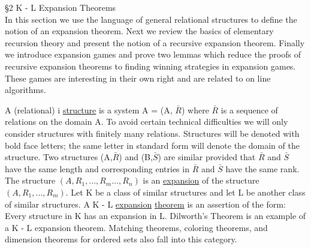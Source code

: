 \documentclass[twoside]{article}
\begin{document}
§2   K - L   Expansion Theorems\\


In this section we use the language of general relational structures to define the notion of an expansion theorem.   Next we review the basics of elementary recursion theory and present the notion of a recursive expansion theorem.    Finally we introduce expansion games and prove two lemmas which reduce the proofs of recursive expansion theorems to finding winning strategies in expansion games.   These games are interesting in their own right and are related to on line algorithms.

\newpage

A (relational) i \underline{structure} is a system   A = (A, $\bar{R}$)   where   $\bar{R}$   is a sequence of relations on the domain   A.   
To avoid certain technical difficulties we will only consider structures with finitely many relations.    
Structures will be denoted with bold face letters;  the same letter in standard form will denote the domain of the structure.   
Two structures (A,$\bar{R}$)   and   (B,$\bar{S}$) are similar    provided that   $\bar{R}$   and   $\bar{S}$ have    the same length and corresponding entries in   $\bar{R}$   and    $\bar{S}$   have the same rank.    The structure
$(A,R_1,...,R_m...,R_n)$    is an \underline{expansion} of  the structure    $(A,R_1,...,R_m)$.    
Let K be a class of similar structures and let   L   be another class of similar structures.   
A   K - L   \underline{expansion} \underline{theorem} is an assertion of the form: Every structure in   K   has an expansion in   L.    Dilworth's Theorem is an example of a   K - L   expansion theorem. Matching theorems, coloring theorems, and dimension theorems for ordered sets also fall into this category.
\end{document}
